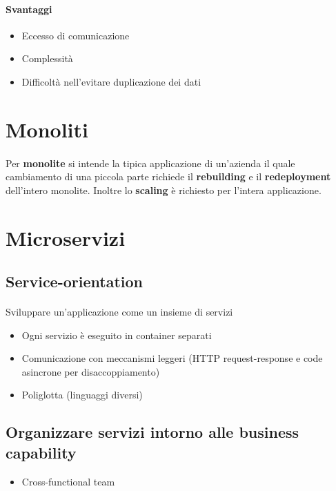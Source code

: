\documentclass[a4paper, 12pt]{report}
\begin{document}
          \paragraph{Svantaggi}
          \begin{itemize}
            \item Eccesso di comunicazione
            \item Complessità
            \item Difficoltà nell'evitare duplicazione dei dati 
          \end{itemize}
          \section{Monoliti}
          \paragraph{}Per \textbf{monolite} si intende la tipica applicazione di un'azienda il quale cambiamento di una piccola parte richiede
          il \textbf{rebuilding} e il \textbf{redeployment} dell'intero monolite. Inoltre lo \textbf{scaling} è richiesto per l'intera applicazione.
          \section{Microservizi}
          \subsection{Service-orientation}
            \paragraph{}Sviluppare un'applicazione come un insieme di servizi
            \begin{itemize}
              \item Ogni servizio è eseguito in container separati
              \item Comunicazione con meccanismi leggeri (HTTP request-response e code asincrone per disaccoppiamento)
              \item Poliglotta (linguaggi diversi)
            \end{itemize}
          \subsection{Organizzare servizi intorno alle business capability}
            \begin{itemize}
              \item Cross-functional team
            \end{itemize}
\end{document}
